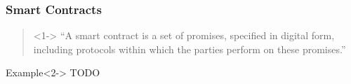 \documentclass[notitlepage, usenames,dvipsnames]{beamer}
\begin{document}
    \begin{frame}
        \frametitle{Smart Contracts}
        
        \begin{center}
        \begin{minipage}{0.75\textwidth}
        \begin{quote}<1->
            ``A smart contract is a set of promises, specified in digital form, including protocols within which the parties perform on these promises.''
            \vspace{-.5ex}
        \end{quote}
        \end{minipage}
        \end{center}

        \begin{exampleblock}{Example}<2->
            TODO
        \end{exampleblock}


    \end{frame}
\end{document}
